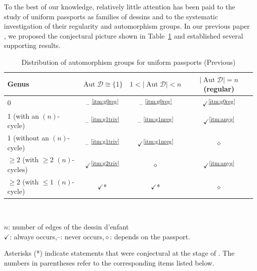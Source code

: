 \documentclass[12pt,reqno]{amsart}
\newcommand{\msD}{\mathscr{D}}
\newcommand{\HL}{\vspace{2mm}}							%
\DeclareMathOperator{\Aut}{Aut}							%
\theoremstyle{mythmstyle}
\theoremstyle{mydefstyle}
\newcommand{\tabref}[1]{Table~\ref{#1}}
\newcommand{\AD}{\Aut{\msD}}
\numberwithin{equation}{section}
\begin{document}
To the best of our knowledge, relatively little attention has been paid to the study of uniform passports as 
families of dessins and to the systematic investigation of their regularity and automorphism groups.
In our previous paper \cite{Ohnishi26}, we proposed the conjectural picture shown in \tabref{tab:genusautd} and
established several supporting results.

\begin{table}[htbp]
\centering
\begin{tabular}{|l|c|c|c|}
\hline
Genus & $\Aut \msD \cong \{ 1 \}$ & $1 < \lvert \AD \rvert < n$ & $\lvert \AD \rvert = n$ (regular) \\
\hline
0 & -- \textsuperscript{\ref{itm:g0reg}} & -- \textsuperscript{\ref{itm:g0reg}} & $\checkmark$\textsuperscript{\ref{itm:g0reg}} \\ \hline
1 (with an $(n)$-cycle) & -- \textsuperscript{\ref{itm:g1triv}}  & -- \textsuperscript{\ref{itm:g1nreg}} & $\checkmark$\textsuperscript{\ref{itm:anyg}} \\ \hline
1 (without an $(n)$-cycle) & -- \textsuperscript{\ref{itm:g1triv}}  & $\checkmark$\textsuperscript{\ref{itm:g1nreg}} & $\diamond$ \\ \hline
$\ge 2$ (with $\ge 2$ $(n)$-cycles) & $\checkmark$\textsuperscript{\ref{itm:g2triv}} & $\diamond$ & $\checkmark$\textsuperscript{\ref{itm:anyg}} \\ \hline
$\ge 2$ (with $\le 1$ $(n)$-cycle) & $\checkmark$* & $\checkmark$* & $\diamond$ \\
\hline
\end{tabular}\\
\begin{flushleft}
\hspace{16pt}$n$: number of edges of the dessin d'enfant \\
\hspace{16pt}$\checkmark$: always occurs,\quad --: never occurs,\quad $\diamond$: depends on the passport.
\end{flushleft}
\HL
\caption{Distribution of automorphism groups for uniform passports (Previous)}
\label{tab:genusautd}
\end{table}

Asterisks (*) indicate statements that were conjectural at the stage of \cite{Ohnishi26}.
The numbers in parentheses refer to the corresponding items listed below.
\end{document}
